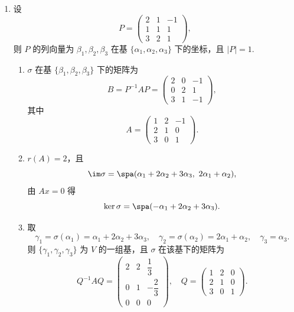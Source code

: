 \begin{enumerate}
\begin{enumerate}
        反之，设 $p(x)=c_0+c_1x+\cdots+c_mx^m$ 满足 $p(\sigma)=0$ 且 $c_0\neq 0$. 则
        \[
            c_0I=-\sigma(c_1I+c_2\sigma+\cdots+c_m\sigma^{m-1}),
        \]
        从而
        \[
            \sigma\left(-\frac{1}{c_0}(c_1I+c_2\sigma+\cdots+c_m\sigma^{m-1})\right)=I.
        \]
        故 $\sigma$ 可逆.
    \end{enumerate}

    \item 设
        \[
            P=\begin{pmatrix}
                2&1&-1\\
                1&1&1\\
                3&2&1
            \end{pmatrix},
        \]
        则 $P$ 的列向量为 $\beta_1,\beta_2,\beta_3$ 在基 $\{\alpha_1,\alpha_2,\alpha_3\}$ 下的坐标，且 $|P|=1$.
    \begin{enumerate}
        \item $\sigma$ 在基 $\{\beta_1,\beta_2,\beta_3\}$ 下的矩阵为
        \[
            B=P^{-1}AP=
            \begin{pmatrix}
                2&0&-1\\
                0&2&1\\
                3&1&-1
            \end{pmatrix},
        \]
        其中
        \[
            A=\begin{pmatrix}
                1&2&-1\\
                2&1&0\\
                3&0&1
            \end{pmatrix}.
        \]

        \item $r(A)=2$，且
        \[
            \im\sigma=\spa(\alpha_1+2\alpha_2+3\alpha_3,\ 2\alpha_1+\alpha_2),
        \]
        由 $Ax=0$ 得
        \[
            \ker\sigma=\spa(-\alpha_1+2\alpha_2+3\alpha_3).
        \]

        \item 取
        \[
            \gamma_1=\sigma(\alpha_1)=\alpha_1+2\alpha_2+3\alpha_3,\quad
            \gamma_2=\sigma(\alpha_2)=2\alpha_1+\alpha_2,\quad
            \gamma_3=\alpha_3.
        \]
        则 $\{\gamma_1,\gamma_2,\gamma_3\}$ 为 $V$ 的一组基，且 $\sigma$ 在该基下的矩阵为
        \[
            Q^{-1}AQ=
            \begin{pmatrix}
                2&2&\dfrac13\\[4pt]
                0&1&-\dfrac23\\[4pt]
                0&0&0
            \end{pmatrix},
            \quad
            Q=\begin{pmatrix}
                1&2&0\\
                2&1&0\\
                3&0&1
            \end{pmatrix}.
        \]


\end{enumerate}
\end{enumerate}
